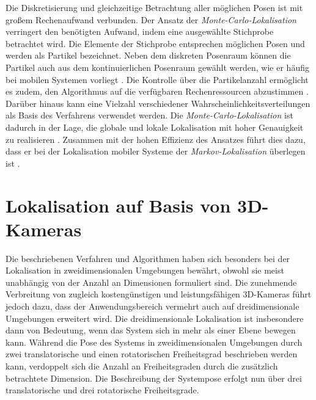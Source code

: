 Die Diskretisierung und gleichzeitige Betrachtung aller möglichen Posen ist mit großem Rechenaufwand verbunden. Der Ansatz der \textit{Monte-Carlo-Lokalisation} verringert den benötigten Aufwand, indem eine ausgewählte Stichprobe betrachtet wird. Die Elemente der Stichprobe entsprechen möglichen Posen und werden als Partikel bezeichnet. Neben dem diskreten Posenraum können die Partikel auch aus dem kontinuierlichen Posenraum gewählt werden, wie er häufig bei mobilen Systemen vorliegt \cite{Fox2001}. Die Kontrolle über die Partikelanzahl ermöglicht es zudem, den Algorithmus auf die verfügbaren Rechenressourcen abzustimmen \cite{Thrun2001}. Darüber hinaus kann eine Vielzahl verschiedener Wahrscheinlichkeitsverteilungen als Basis des Verfahrens verwendet werden. Die \textit{Monte-Carlo-Lokalisation} ist dadurch in der Lage, die globale und lokale Lokalisation mit hoher Genauigkeit zu realisieren \cite{Thrun2005}. Zusammen mit der hohen Effizienz des Ansatzes führt dies dazu, dass er bei der Lokalisation mobiler Systeme der \textit{Markov-Lokalisation} überlegen ist \cite{Fox2001}.



\prever{
}

\prever{
}
\section{Lokalisation auf Basis von 3D-Kameras}
Die beschriebenen Verfahren und Algorithmen haben sich besonders bei der Lokalisation in zweidimensionalen Umgebungen bewährt, obwohl sie meist unabhängig von der Anzahl an Dimensionen formuliert sind. Die zunehmende Verbreitung von zugleich kostengünstigen und leistungsfähigen 3D-Kameras führt jedoch dazu, dass der Anwendungsbereich vermehrt auch auf dreidimensionale Umgebungen erweitert wird. Die dreidimensionale Lokalisation ist insbesondere dann von Bedeutung, wenn das System sich in mehr als einer Ebene bewegen kann. Während die Pose des Systems in zweidimensionalen Umgebungen durch zwei translatorische und einen rotatorischen Freiheitsgrad beschrieben werden kann, verdoppelt sich die Anzahl an Freiheitsgraden durch die zusätzlich betrachtete Dimension. Die Beschreibung der Systempose erfolgt nun über drei translatorische und drei rotatorische Freiheitsgrade.\\

